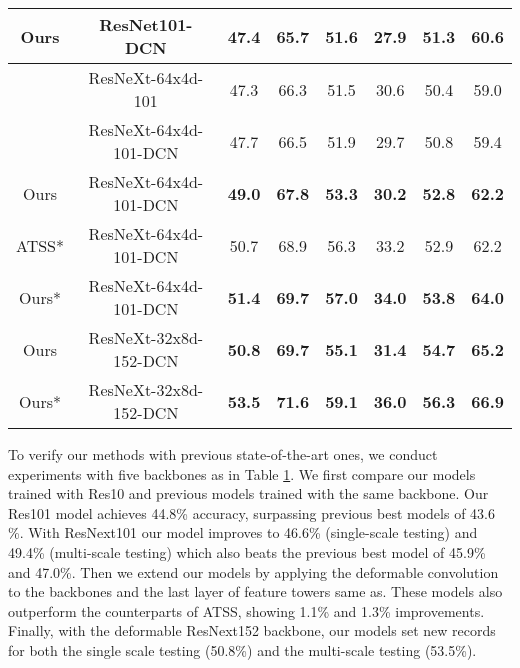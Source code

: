 \documentclass[runningheads]{llncs}
\begin{document}
\begin{table}[t]
\begin{center}
\begin{tabular}{c|c|ccc|ccc}
Ours & ResNet101-DCN & \textbf{47.4} & 65.7 & \textbf{51.6} & \textbf{27.9} & \textbf{51.3} & \textbf{60.6} \\
\hline
\begin{comment}
FreeAnchor\cite{freeanchor}* & ResNeXt-64x4d-101 & 47.3 & 66.3 & 51.5 & 30.6 & 50.4 & 59.0 \\
\hline
\end{comment}
ATSS\cite{atss} & ResNeXt-64x4d-101-DCN & 47.7 & 66.5 & 51.9 & 29.7 & 50.8 & 59.4 \\
Ours & ResNeXt-64x4d-101-DCN & \textbf{49.0} & \textbf{67.8} & \textbf{53.3} & \textbf{30.2} & \textbf{52.8} & \textbf{62.2} \\
\hline
ATSS\cite{atss}* & ResNeXt-64x4d-101-DCN & 50.7 & 68.9 & 56.3 & 33.2 & 52.9 & 62.2 \\
Ours* & ResNeXt-64x4d-101-DCN & \textbf{51.4} & \textbf{69.7} & \textbf{57.0} & \textbf{34.0} & \textbf{53.8} & \textbf{64.0} \\
\hline
Ours & ResNeXt-32x8d-152-DCN & \textbf{50.8} & \textbf{69.7} & \textbf{55.1} & \textbf{31.4} & \textbf{54.7} & \textbf{65.2} \\
\hline
Ours* & ResNeXt-32x8d-152-DCN & \textbf{53.5} & \textbf{71.6} & \textbf{59.1} & \textbf{36.0} & \textbf{56.3} & \textbf{66.9} \\
\hline
\end{tabular}
\label{table:test}
\end{center}
\end{table}

To verify our methods with previous state-of-the-art ones, we conduct experiments with five backbones as in Table \ref{table:test}. We first compare our models trained with Res10 and previous models trained with the same backbone. Our Res101 model achieves 44.8\% accuracy, surpassing previous best models\cite{atss, mal} of 43.6 \%. With ResNext101 our model improves to 46.6\% (single-scale testing) and 49.4\% (multi-scale testing) which also beats the previous best model of 45.9\% and 47.0\%\cite{mal}. Then we extend our models by applying the deformable convolution to the backbones and the last layer of feature towers same as\cite{atss}. These models also outperform the counterparts of ATSS, showing 1.1\% and 1.3\% improvements. Finally, with the deformable ResNext152 backbone, our models set new records for both the single scale testing (50.8\%)  and the multi-scale testing (53.5\%).
\end{document}
